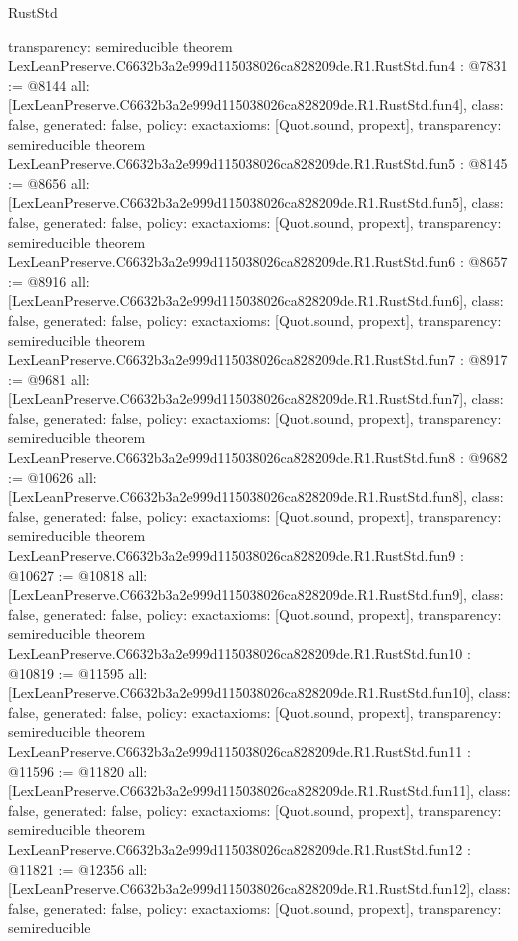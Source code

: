 \begin{lexlean}{RustStd}
\begin{coremodule}
{  transparency: semireducible
}
theorem LexLeanPreserve.C6632b3a2e999d115038026ca828209de.R1.RustStd.fun4 : @7831 := @8144 {
  all: [LexLeanPreserve.C6632b3a2e999d115038026ca828209de.R1.RustStd.fun4],
  class: false,
  generated: false,
  policy: exact{axioms: [Quot.sound, propext]},
  transparency: semireducible
}
theorem LexLeanPreserve.C6632b3a2e999d115038026ca828209de.R1.RustStd.fun5 : @8145 := @8656 {
  all: [LexLeanPreserve.C6632b3a2e999d115038026ca828209de.R1.RustStd.fun5],
  class: false,
  generated: false,
  policy: exact{axioms: [Quot.sound, propext]},
  transparency: semireducible
}
theorem LexLeanPreserve.C6632b3a2e999d115038026ca828209de.R1.RustStd.fun6 : @8657 := @8916 {
  all: [LexLeanPreserve.C6632b3a2e999d115038026ca828209de.R1.RustStd.fun6],
  class: false,
  generated: false,
  policy: exact{axioms: [Quot.sound, propext]},
  transparency: semireducible
}
theorem LexLeanPreserve.C6632b3a2e999d115038026ca828209de.R1.RustStd.fun7 : @8917 := @9681 {
  all: [LexLeanPreserve.C6632b3a2e999d115038026ca828209de.R1.RustStd.fun7],
  class: false,
  generated: false,
  policy: exact{axioms: [Quot.sound, propext]},
  transparency: semireducible
}
theorem LexLeanPreserve.C6632b3a2e999d115038026ca828209de.R1.RustStd.fun8 : @9682 := @10626 {
  all: [LexLeanPreserve.C6632b3a2e999d115038026ca828209de.R1.RustStd.fun8],
  class: false,
  generated: false,
  policy: exact{axioms: [Quot.sound, propext]},
  transparency: semireducible
}
theorem LexLeanPreserve.C6632b3a2e999d115038026ca828209de.R1.RustStd.fun9 : @10627 := @10818 {
  all: [LexLeanPreserve.C6632b3a2e999d115038026ca828209de.R1.RustStd.fun9],
  class: false,
  generated: false,
  policy: exact{axioms: [Quot.sound, propext]},
  transparency: semireducible
}
theorem LexLeanPreserve.C6632b3a2e999d115038026ca828209de.R1.RustStd.fun10 : @10819 := @11595 {
  all: [LexLeanPreserve.C6632b3a2e999d115038026ca828209de.R1.RustStd.fun10],
  class: false,
  generated: false,
  policy: exact{axioms: [Quot.sound, propext]},
  transparency: semireducible
}
theorem LexLeanPreserve.C6632b3a2e999d115038026ca828209de.R1.RustStd.fun11 : @11596 := @11820 {
  all: [LexLeanPreserve.C6632b3a2e999d115038026ca828209de.R1.RustStd.fun11],
  class: false,
  generated: false,
  policy: exact{axioms: [Quot.sound, propext]},
  transparency: semireducible
}
theorem LexLeanPreserve.C6632b3a2e999d115038026ca828209de.R1.RustStd.fun12 : @11821 := @12356 {
  all: [LexLeanPreserve.C6632b3a2e999d115038026ca828209de.R1.RustStd.fun12],
  class: false,
  generated: false,
  policy: exact{axioms: [Quot.sound, propext]},
  transparency: semireducible
}
\end{coremodule}
\end{lexlean}
